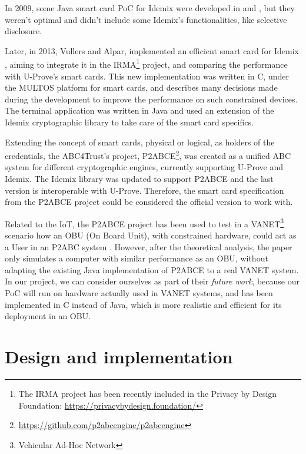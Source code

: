 \documentclass[journal]{IEEEtran}
\begin{document}
In 2009, some Java smart card PoC for Idemix were developed in \cite{javaIdemix1} and \cite{javaIdemix2}, but they weren't optimal and didn't include some Idemix's functionalities, like selective disclosure.

Later, in 2013, Vullers and Alpar, implemented an efficient smart card for Idemix \cite{vullers2013efficient}, aiming to integrate it in the IRMA\footnote{The IRMA project has been recently included in the Privacy by Design Foundation: \url{https://privacybydesign.foundation/}} project, and comparing the performance with U-Prove's smart cards. This new implementation was written in C, under the MULTOS platform for smart cards, and describes many decisions made during the development to improve the performance on such constrained devices. The terminal application was written in Java and used an extension of the Idemix cryptographic library to take care of the smart card specifics.


Extending the concept of smart cards, physical or logical, as holders of the credentials, the ABC4Trust's project, P2ABCE\footnote{\url{https://github.com/p2abcengine/p2abcengine}}, was created as a unified ABC system for different cryptographic engines, currently supporting U-Prove and Idemix. The Idemix library was updated to support P2ABCE and the last version is interoperable with U-Prove. Therefore, the smart card specification from the P2ABCE project could be considered the official version to work with.


Related to the IoT, the P2ABCE project has been used to test in a VANET\footnote{Vehicular Ad-Hoc Network} scenario how an OBU (On Board Unit), with constrained hardware, could act as a User in an P2ABC system \cite{vanet}. However, after the theoretical analysis, the paper only simulates a computer with similar performance as an OBU, without adapting the existing Java implementation of P2ABCE to a real VANET system. In our project, we can consider ourselves as part of their \textit{future work}, because our PoC will run on hardware actually used in VANET systems, and has been implemented in C instead of Java, which is more realistic and efficient for its deployment in an OBU.








\section{Design and implementation}
\end{document}
